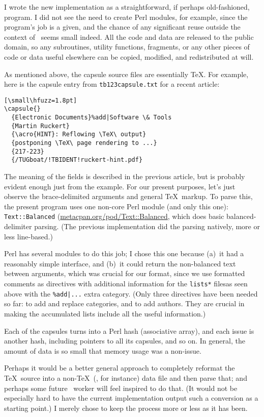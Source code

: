 \documentclass[final]{ltugboat}
\def\code#1{{\tt #1}}
\begin{document}
I wrote the new implementation as a straightforward, if perhaps
old-fashioned, program. I did not see the need to create Perl modules,
for example, since the program's job is a given, and the chance of any
significant reuse outside the context of \TUB\ seems small indeed. All
the code and data are released to the public domain, so any subroutines,
utility functions, fragments, or any other pieces of code or data useful
elsewhere can be copied, modified, and redistributed at will.

As mentioned above, the capsule source files are essentially \TeX. For
example, here is the capsule entry from \code{tb123capsule.txt} for a
recent article:

\begin{verbatim}[\small\hfuzz=1.8pt]
\capsule{}
  {Electronic Documents}%add|Software \& Tools
  {Martin Ruckert}
  {\acro{HINT}: Reflowing \TeX\ output}
  {postponing \TeX\ page rendering to ...}
  {217-223}
  {/TUGboat/!TBIDENT!ruckert-hint.pdf}
\end{verbatim}

\noindent The meaning of the fields is described in the previous
article, but is probably evident enough just from the example. For our
present purposes, let's just observe the brace-delimited arguments and
general \TeX\ markup. To parse this, the present program uses one
non-core Perl module (and only this one): \code{Text::Balanced}
(\url{metacpan.org/pod/Text::Balanced}, which does basic
balanced-delimiter parsing. (The previous implementation did the parsing
natively, more or less line-based.)

Perl has several modules to do this job; I chose this one because (a)~it
had a reasonably simple interface, and (b)~it could return the
non-balanced text between arguments, which was crucial for our format,
since we use formatted comments as directives with additional
information for the \code{lists*} files\Dash as seen above with the
\code{\%add|...} extra category. (Only three directives have been needed
so far: to add and replace categories, and to add authors. They are
crucial in making the accumulated lists include all the useful
information.)

Each of the capsules turns into a Perl hash (associative array), and
each issue is another hash, including pointers to all its capsules, and
so on. In general, the amount of data is so small that memory usage was
a non-issue.

Perhaps it would be a better general approach to completely reformat the
\TeX\ source into a non-\TeX\ (, for instance) data file and
then parse that; and perhaps some future \TUB\ worker will feel inspired
to do that. (It would not be especially hard to have the current
implementation output such a conversion as a starting point.) I merely
chose to keep the process more or less as it has been.
\end{document}
